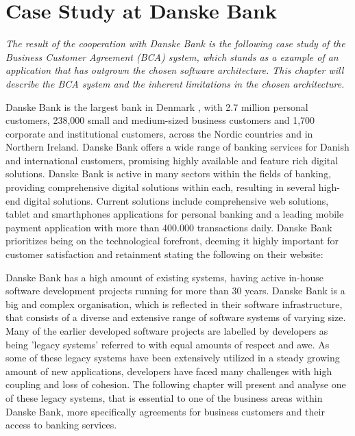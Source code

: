 \chapter{Case Study at Danske Bank}
\textit{The result of the cooperation with Danske Bank is the following case study of the Business Customer Agreement (BCA) system, which stands as a example of an application that has outgrown the chosen software architecture. This chapter will describe the BCA system and the inherent limitations in the chosen architecture.}

Danske Bank is the largest bank in Denmark \cite[p.~38]{danske_bank_setting_up_in_denmark}, with 2.7 million personal customers, 238,000 small and medium-sized business customers and 1,700 corporate and institutional customers, across the Nordic countries and in Northern Ireland. Danske Bank offers a wide range of banking services for Danish and international customers, promising highly available and feature rich digital solutions. Danske Bank is active in many sectors within the fields of banking, providing comprehensive digital solutions within each, resulting in several high-end digital solutions. Current solutions include comprehensive web solutions, tablet and smarthphones applications for personal banking and a leading mobile payment application with more than 400.000 transactions daily. Danske Bank prioritizes being on the technological forefront, deeming it highly important for customer satisfaction and retainment stating the following on their website\cite{danske_bank_our_essence}:



Danske Bank has a high amount of existing systems, having active in-house software development projects running for more than 30 years. Danske Bank is a big and complex organisation, which is reflected in their software infrastructure, that consists of a diverse and extensive range of software systems of varying size. Many of the earlier developed software projects are labelled by developers as being 'legacy systems' referred to with equal amounts of respect and awe. As some of these legacy systems have been extensively utilized in a steady growing amount of new applications, developers have faced many challenges with high coupling and loss of cohesion. The following chapter will present and analyse one of these legacy systems, that is essential to one of the business areas within Danske Bank, more specifically agreements for business customers and their access to banking services.

